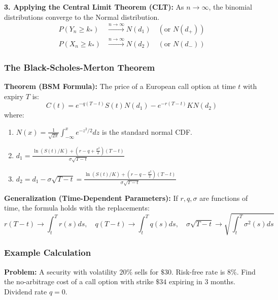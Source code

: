 \textbf{3. Applying the Central Limit Theorem (CLT):}
As \(n \to \infty\), the binomial distributions converge to the Normal distribution.
\begin{align*}
    P(Y_n \ge k_*) &\xrightarrow{n \to \infty} N(d_1) \quad (\text{or } N(d_+)) \\
    P(X_n \ge k_*) &\xrightarrow{n \to \infty} N(d_2) \quad (\text{or } N(d_-))
\end{align*}

\subsubsection{The Black-Scholes-Merton Theorem}
\textbf{Theorem (BSM Formula):} The price of a European call option at time \(t\) with expiry \(T\) is:
\begin{equation*}
    \boxed{C(t) = e^{-q(T-t)} S(t) N(d_1) - e^{-r(T-t)} K N(d_2)}
\end{equation*}
where:
\begin{enumerate}
    \item \(N(x) = \frac{1}{\sqrt{2\pi}} \int_{-\infty}^{x} e^{-z^2/2} dz\) is the standard normal CDF.
    \item \(d_1 = \frac{\ln(S(t)/K) + (r - q + \frac{\sigma^2}{2})(T-t)}{\sigma\sqrt{T-t}}\)
    \item \(d_2 = d_1 - \sigma\sqrt{T-t} = \frac{\ln(S(t)/K) + (r - q - \frac{\sigma^2}{2})(T-t)}{\sigma\sqrt{T-t}}\)
\end{enumerate}

\noindent \textbf{Generalization (Time-Dependent Parameters):}
If \(r, q, \sigma\) are functions of time, the formula holds with the replacements:
\begin{equation*}
    r(T-t) \to \int_t^T r(s) ds, \quad q(T-t) \to \int_t^T q(s) ds, \quad \sigma\sqrt{T-t} \to \sqrt{\int_t^T \sigma^2(s) ds}
\end{equation*}

\subsubsection{Example Calculation}
\textbf{Problem:} A security with volatility \(20\%\) sells for \(\$30\). Risk-free rate is \(8\%\). Find the no-arbitrage cost of a call option with strike \(\$34\) expiring in 3 months. Dividend rate \(q=0\).

